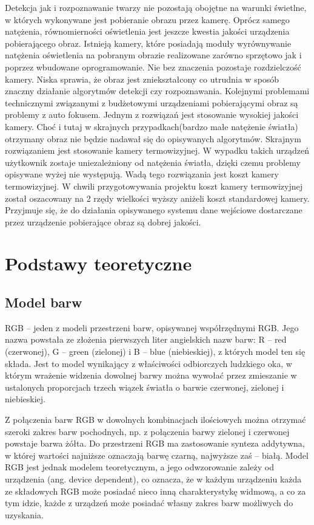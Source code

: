 \documentclass[eng,printmode]{mgr}
\begin{document}
Detekcja jak i rozpoznawanie twarzy nie pozostają obojętne na warunki świetlne, w których wykonywane jest pobieranie obrazu przez kamerę. Oprócz samego natężenia, równomierności oświetlenia jest jeszcze kwestia jakości urządzenia pobierającego obraz. Istnieją kamery, które posiadają moduły wyrównywanie natężenia oświetlenia na pobranym obrazie realizowane zarówno sprzętowo jak i poprzez wbudowane oprogramowanie. Nie bez znaczenia pozostaje rozdzielczość kamery. Niska sprawia, że obraz jest zniekształcony co utrudnia w sposób znaczny działanie algorytmów detekcji czy rozpoznawania. Kolejnymi problemami technicznymi związanymi z budżetowymi urządzeniami pobierającymi obraz są problemy z auto fokusem. Jednym z rozwiązań jest stosowanie wysokiej jakości kamery. Choć i tutaj w skrajnych przypadkach(bardzo małe natężenie światła) otrzymany obraz nie będzie nadawał się do opisywanych algorytmów. Skrajnym rozwiązaniem jest stosowanie kamery termowizyjnej. W wypadku takich urządzeń użytkownik zostaje uniezależniony od natężenia światła, dzięki czemu problemy opisywane wyżej nie występują. Wadą tego rozwiązania jest koszt kamery termowizyjnej. W chwili przygotowywania projektu koszt kamery termowizyjnej został oszacowany na 2 rzędy wielkości wyższy aniżeli koszt standardowej kamery. Przyjmuje się, że do działania opisywanego systemu dane wejściowe dostarczane przez urządzenie pobierające obraz są dobrej jakości.
\chapter{Podstawy teoretyczne}


\section{Model barw}

RGB – jeden z modeli przestrzeni barw, opisywanej współrzędnymi RGB. Jego nazwa powstała ze złożenia pierwszych liter angielskich nazw barw: R – red (czerwonej), G – green (zielonej) i B – blue (niebieskiej), z których model ten się składa. Jest to model wynikający z właściwości odbiorczych ludzkiego oka, w którym wrażenie widzenia dowolnej barwy można wywołać przez zmieszanie w ustalonych proporcjach trzech wiązek światła o barwie czerwonej, zielonej i niebieskiej.

Z połączenia barw RGB w dowolnych kombinacjach ilościowych można otrzymać szeroki zakres barw pochodnych, np. z połączenia barwy zielonej i czerwonej powstaje barwa żółta. Do przestrzeni RGB ma zastosowanie synteza addytywna, w której wartości najniższe oznaczają barwę czarną, najwyższe zaś – białą. Model RGB jest jednak modelem teoretycznym, a jego odwzorowanie zależy od urządzenia (ang. device dependent), co oznacza, że w każdym urządzeniu każda ze składowych RGB może posiadać nieco inną charakterystykę widmową, a co za tym idzie, każde z urządzeń może posiadać własny zakres barw możliwych do uzyskania.
\end{document}
